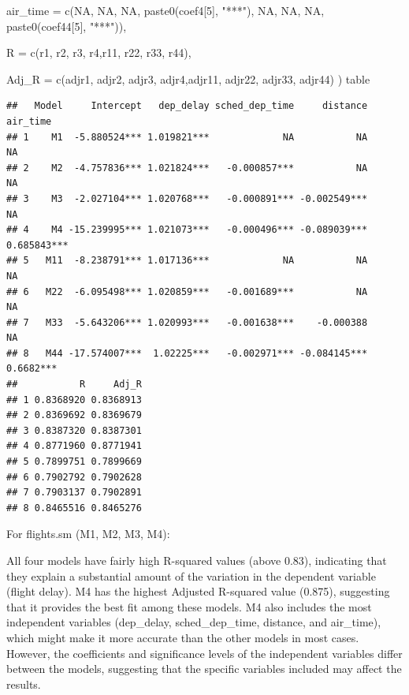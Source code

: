 \documentclass[
]{article}
\newenvironment{Shaded}{\begin{snugshade}}{\end{snugshade}}
\newcommand{\AttributeTok}[1]{\textcolor[rgb]{0.77,0.63,0.00}{#1}}
\newcommand{\DecValTok}[1]{\textcolor[rgb]{0.00,0.00,0.81}{#1}}
\newcommand{\FunctionTok}[1]{\textcolor[rgb]{0.00,0.00,0.00}{#1}}
\newcommand{\NormalTok}[1]{#1}
\newcommand{\StringTok}[1]{\textcolor[rgb]{0.31,0.60,0.02}{#1}}
\begin{document}
\begin{Shaded}
\begin{Highlighting}[]
  \AttributeTok{air\_time =} \FunctionTok{c}\NormalTok{(}\StringTok{\textquotesingle{}NA\textquotesingle{}}\NormalTok{,}
               \StringTok{\textquotesingle{}NA\textquotesingle{}}\NormalTok{,}
               \StringTok{\textquotesingle{}NA\textquotesingle{}}\NormalTok{,}
               \FunctionTok{paste0}\NormalTok{(coef4[}\DecValTok{5}\NormalTok{], }\StringTok{"***"}\NormalTok{),}
               \StringTok{\textquotesingle{}NA\textquotesingle{}}\NormalTok{,}
               \StringTok{\textquotesingle{}NA\textquotesingle{}}\NormalTok{,}
               \StringTok{\textquotesingle{}NA\textquotesingle{}}\NormalTok{,}
               \FunctionTok{paste0}\NormalTok{(coef44[}\DecValTok{5}\NormalTok{], }\StringTok{"***"}\NormalTok{)),}
  
  \AttributeTok{R =} \FunctionTok{c}\NormalTok{(r1, r2, r3, r4,r11, r22, r33, r44),}
  
  \AttributeTok{Adj\_R =} \FunctionTok{c}\NormalTok{(adjr1, adjr2, adjr3, adjr4,adjr11, adjr22, adjr33, adjr44)}
\NormalTok{)}
\NormalTok{table}
\end{Highlighting}
\end{Shaded}

\begin{verbatim}
##   Model     Intercept   dep_delay sched_dep_time     distance    air_time
## 1    M1  -5.880524*** 1.019821***             NA           NA          NA
## 2    M2  -4.757836*** 1.021824***   -0.000857***           NA          NA
## 3    M3  -2.027104*** 1.020768***   -0.000891*** -0.002549***          NA
## 4    M4 -15.239995*** 1.021073***   -0.000496*** -0.089039*** 0.685843***
## 5   M11  -8.238791*** 1.017136***             NA           NA          NA
## 6   M22  -6.095498*** 1.020859***   -0.001689***           NA          NA
## 7   M33  -5.643206*** 1.020993***   -0.001638***    -0.000388          NA
## 8   M44 -17.574007***  1.02225***   -0.002971*** -0.084145***   0.6682***
##           R     Adj_R
## 1 0.8368920 0.8368913
## 2 0.8369692 0.8369679
## 3 0.8387320 0.8387301
## 4 0.8771960 0.8771941
## 5 0.7899751 0.7899669
## 6 0.7902792 0.7902628
## 7 0.7903137 0.7902891
## 8 0.8465516 0.8465276
\end{verbatim}

For flights.sm (M1, M2, M3, M4):

All four models have fairly high R-squared values (above 0.83),
indicating that they explain a substantial amount of the variation in
the dependent variable (flight delay). M4 has the highest Adjusted
R-squared value (0.875), suggesting that it provides the best fit among
these models. M4 also includes the most independent variables
(dep\_delay, sched\_dep\_time, distance, and air\_time), which might
make it more accurate than the other models in most cases. However, the
coefficients and significance levels of the independent variables differ
between the models, suggesting that the specific variables included may
affect the results.
\end{document}
